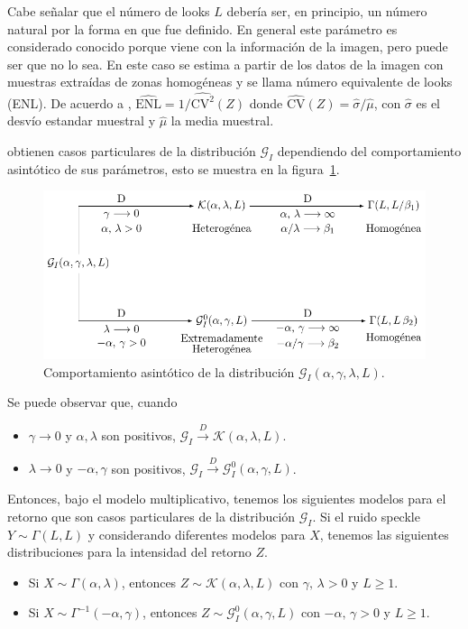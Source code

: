 Cabe señalar que el número de looks $L$ debería ser, en principio, un número natural por la forma en que fue definido. En general este parámetro es considerado conocido porque viene con la información de la imagen, pero puede ser que no lo sea. En este caso se estima a partir de los datos de la imagen con muestras extraídas de zonas homogéneas y se llama número equivalente de looks (ENL). De acuerdo a \citet{anfinsen2009}, $\widehat{\text{ENL}}={1}/{\widehat{\text{CV}^2}(Z)}$ donde $\widehat{\text{CV}}(Z)={\widehat{\sigma}}/{\widehat\mu}$, con $\widehat{\sigma}$ es el desvío estandar muestral y $\widehat\mu$ la media muestral.

\citet{Frery99} obtienen casos particulares de la distribución $\mathcal{G}_I$ dependiendo del comportamiento asintótico de sus parámetros, esto se muestra en la figura~\ref{RelacionGI}.  
\begin{figure}[hbt]
	\centering    
	\includegraphics[scale=1]{../../Figures/Tesis/Capitulo4/RelacionGI.pdf}
	\caption{\label{RelacionGI}Comportamiento asintótico de la distribución $\mathcal{G}_I(\alpha,\gamma,\lambda,L)$.} %
\end{figure} 

Se puede observar que, cuando 
\begin{itemize}
	\item $\gamma \rightarrow 0$ y $\alpha,\lambda$ son positivos, $\mathcal{G}_I \stackrel{D}{\longrightarrow}\mathcal{K}(\alpha,\lambda,L)$.
	\item $\lambda \rightarrow 0$ y $-\alpha,\gamma$ son positivos, $\mathcal{G}_I\stackrel{D}{\longrightarrow}\mathcal{G}_I^0(\alpha,\gamma,L)$.
\end{itemize}

Entonces, bajo el modelo multiplicativo, tenemos los siguientes modelos para el retorno que son casos particulares de la distribución $\mathcal{G}_I$. Si el ruido speckle $Y \sim \Gamma(L,L)$ y considerando diferentes modelos para $X$, tenemos las siguientes distribuciones para la intensidad del retorno $Z$.
\begin{itemize}
	\item Si $X \sim \Gamma(\alpha,\lambda)$, entonces $Z \sim \mathcal{K}(\alpha,\lambda,L)$ con $\gamma, \, \lambda >0$ y $L \geq 1$.
	\item Si $X \sim \Gamma^{-1}(-\alpha,\gamma)$, entonces $Z \sim \mathcal{G}_I^0(\alpha,\gamma,L)$ con $-\alpha, \, \gamma >0$ y $L \geq 1$.
\end{itemize}

